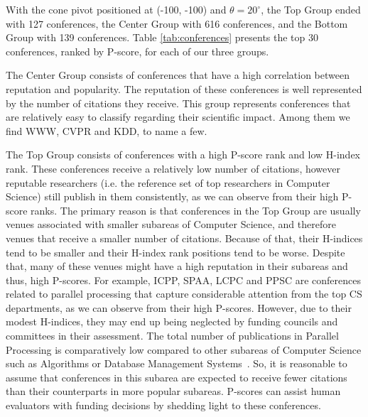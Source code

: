 \documentclass[man]{apa6}
\begin{document}
With the cone pivot positioned at (-100, -100) and $ \theta=20^{\circ} $, the Top Group ended with 127 conferences, the 
Center Group with 616 conferences, and the Bottom Group with 139 conferences. Table 
\ref{tab:conferences} presents the top 30 conferences, ranked by P-score, for each of our three groups.

The Center Group consists of conferences that have a high correlation between reputation and
popularity. The reputation of these conferences is well represented by the number of citations
they receive. This group represents conferences that are relatively easy to classify regarding
their scientific impact. Among them we find WWW, CVPR and KDD, to name a few.

The Top Group consists of conferences with a high P-score rank and low H-index rank. These conferences
receive a relatively low number of citations, however reputable researchers (i.e. the reference set of top researchers in Computer Science) still publish 
in them consistently, as we can observe from their high P-score ranks. The primary reason is that
conferences in the Top Group are usually venues associated with smaller subareas of Computer Science, and therefore venues that receive a smaller
number of citations. Because of that, their H-indices tend to be smaller and their H-index rank positions tend to be worse. Despite that, many of these venues might have a high reputation in their subareas and thus, high P-scores. 
For example, ICPP, SPAA, LCPC and PPSC are conferences related to parallel processing that capture
considerable attention from the top CS departments, as we can observe from their high P-scores. However,
due to their modest H-indices, they may end up being neglected by funding councils and committees in
their assessment. The total number of publications in Parallel Processing is comparatively low 
compared to other subareas of Computer Science such as Algorithms or Database Management Systems~\cite{Hoonlor2013}. So, it is reasonable to assume that conferences 
in this subarea are expected to receive fewer citations than their counterparts in more popular subareas.
P-scores can assist human evaluators with funding decisions by shedding light to these conferences.
\end{document}
